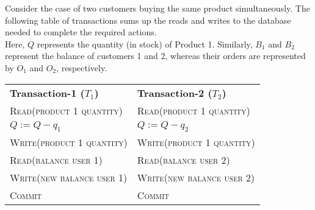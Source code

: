 Consider the case of two customers buying the same product simultaneously.
The following table of transactions sums up the reads and writes to the database needed to complete the required actions. \\
Here, $Q$ represents the quantity (in stock) of Product 1. Similarly, $B_{1}$ and $B_{2}$ represent the balance of
customers 1 and 2, whereas their orders are represented by $O_{1}$ and $O_{2}$, respectively.

\begin{center}
    \begin{adjustbox}{width=\textwidth}
        \begin{tabularx}{\textwidth}{|X|X|}
        \hline
        \multirow{2}{*}{\textbf{Transaction-1 ($T_{1}$)}} & \multirow{2}{*}{\textbf{Transaction-2 ($T_{2}$)}} \\
        & \\ \hline
        \textsc{Read(product 1 quantity)} & \textsc{Read(product 1 quantity)} \\
        $Q := Q - q_{1}$ & $Q := Q - q_{2}$ \\
        \textsc{Write(product 1 quantity)} & \textsc{Write(product 1 quantity)} \\
        \textsc{Read(balance user 1)} & \textsc{Read(balance user 2)} \\
        \textsc{Write(new balance user 1)} & \textsc{Write(new balance user 2)} \\
        \textsc{Commit} & \textsc{Commit} \\
        \hline
        \end{tabularx}
    \end{adjustbox}
\end{center}

\vspace*{2.5pt}